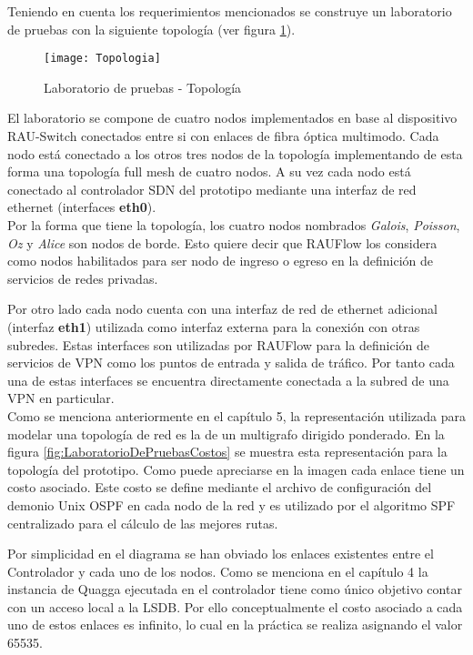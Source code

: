 Teniendo en cuenta los requerimientos mencionados se construye un laboratorio de pruebas con la siguiente topolog\'ia (ver figura \ref{fig:LaboratorioDePruebasTopo}).
  
\begin{figure}[ht!] 
\centering    
\texttt{[image: Topologia]}
\caption[Laboratorio de pruebas - Topolog\'ia]{Laboratorio de pruebas - Topolog\'ia}
\label{fig:LaboratorioDePruebasTopo}
\end{figure}

El laboratorio se compone de cuatro nodos implementados en base al dispositivo RAU-Switch conectados entre si con enlaces de fibra \'optica multimodo. Cada nodo est\'a conectado a los otros tres nodos de la topolog\'ia implementando de esta forma una topolog\'ia full mesh de cuatro nodos. A su vez cada nodo est\'a conectado al controlador SDN del prototipo mediante una interfaz de red ethernet (interfaces \textbf{eth0}).\\

Por la forma que tiene la topolog\'ia, los cuatro nodos nombrados \textit{Galois}, \textit{Poisson}, \textit{Oz} y \textit{Alice} son nodos de borde. Esto quiere decir que RAUFlow los considera como nodos habilitados para ser nodo de ingreso o egreso en la definici\'on de servicios de redes privadas.

Por otro lado cada nodo cuenta con una interfaz de red de ethernet adicional (interfaz \textbf{eth1}) utilizada como interfaz externa para la conexi\'on con otras subredes. Estas interfaces son utilizadas por RAUFlow para la definici\'on de servicios de VPN como los puntos de entrada y salida de tr\'afico. Por tanto cada una de estas interfaces se encuentra directamente conectada a la subred de una VPN en particular.\\  

Como se menciona anteriormente en el cap\'itulo 5, la representaci\'on utilizada para modelar una topolog\'ia de red es la de un multigrafo dirigido ponderado. En la figura \ref{fig:LaboratorioDePruebasCostos} se muestra esta representaci\'on para la topolog\'ia del prototipo. Como puede apreciarse en la imagen cada enlace tiene un costo asociado. Este costo se define mediante el archivo de configuraci\'on del demonio Unix OSPF en cada nodo de la red y es utilizado por el algoritmo SPF centralizado para el c\'alculo de las mejores rutas.

Por simplicidad en el diagrama se han obviado los enlaces existentes entre el Controlador y cada uno de los nodos. Como se menciona en el cap\'itulo 4 la instancia de Quagga ejecutada en el controlador tiene como \'unico objetivo contar con un acceso local a la LSDB. Por ello conceptualmente el costo asociado a cada uno de estos enlaces es infinito, lo cual en la pr\'actica se realiza asignando el valor 65535.  

